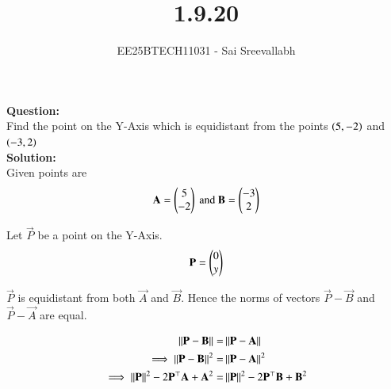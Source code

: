 \documentclass[journal]{IEEEtran}
\begin{document}

\vspace{3cm}

\title{1.9.20}
\author {EE25BTECH11031 - Sai Sreevallabh}
{\let\newpage\relax\maketitle}

\renewcommand{\thefigure}{\theenumi}
\renewcommand{\thetable}{\theenumi}
\setlength{\intextsep}{10pt} %


\renewcommand{\thetable}{\theenumi}

\textbf{Question: }\\

Find the point on the Y-Axis which is equidistant from the points $\left(5,-2\right)$ and $\left(-3,2\right)$\\ 

\textbf{Solution: }\\

Given points are\\
\begin{align}
    \mathbf{A}=\begin{pmatrix}5\\-2\end{pmatrix} \ \text{and}\  \mathbf{B}=\begin{pmatrix}-3\\2\end{pmatrix}
\end{align}

Let $\vec{P}$ be a point on the Y-Axis. \\
\begin{align}
    \mathbf{P}=\begin{pmatrix}0\\y\end{pmatrix}
\end{align}

$\vec{P}$ is equidistant from both $\vec{A}$ and $\vec{B}$. Hence the norms of vectors $\vec{P}-\vec{B}$ and $\vec{P}-\vec{A}$ are equal. 

\begin{align}
    \left\lVert\mathbf{P}-\mathbf{B}\right\rVert =& \left\lVert\mathbf{P}-\mathbf{A}\right\rVert\\
    \implies  \left\lVert\mathbf{P}-\mathbf{B}\right\rVert^2 =& \left\lVert\mathbf{P}-\mathbf{A}\right\rVert^2\\
    \implies \left\lVert\mathbf{P}\right\rVert^2 - 2\mathbf{P}^\top\mathbf{A} + \mathbf{A}^2 =& \left\lVert\mathbf{P}\right\rVert^2 - 2\mathbf{P}^\top\mathbf{B} + \mathbf{B}^2
\end{align}
\end{document}
